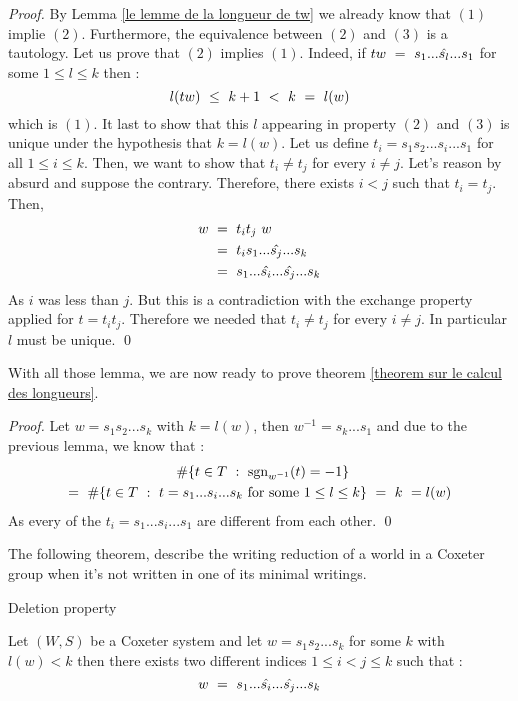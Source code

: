 \begin{proof}
	By Lemma \ref{le lemme de la longueur de tw} we already know that $(1)$ implie $(2)$. Furthermore, the equivalence between $(2)$ and $(3)$ is a tautology. Let us prove that $(2)$ implies $(1)$. Indeed, if $tw\text{ }=\text{ } s_1...\hat{s_l}...s_1$ for some $1\leq l\leq k$ then :
	\begin{equation}
	l(tw)\text{ } \leq \text{ } k+1\text{ } <\text{ } k \text{ }=\text{ } l(w)
	\end{equation} 
	which is $(1)$. It last to show that this $l$ appearing in property $(2)$ and $(3)$ is unique under the hypothesis that $k=l(w)$. Let us define $t_i=s_1s_2...s_i...s_1$ for all $1\leq i\leq k$. Then, we want to show that  $t_i\not=t_j$ for every $i\not=j$. Let's reason by absurd and suppose the contrary. Therefore, there exists $i<j$ such that $t_i=t_j$. Then, 
	\begin{equation}
	\begin{split}
	w\text{ }&=\text{ } t_it_j\text{ } w\\
	&=\text{ } t_is_1...\hat{s_j}...s_k\\
	&=\text{ } s_1...\hat{s_i}...\hat{s_j}...s_k
	\end{split}
	\end{equation} 
	As $i$ was less than $j$. But this is a contradiction with the exchange property applied for $t=t_it_j$. Therefore we needed that $t_i\not=t_j$ for every $i\not=j$. In particular $l$ must be unique.
	\qed 
\end{proof}
With all those lemma, we are now ready to prove theorem \ref{theorem sur le calcul des longueurs}. 
\begin{proof}
	Let $w=s_1s_2...s_k$ with $k=l(w)$, then $w^{-1}=s_k...s_1$ and due to the previous lemma, we know that :
	\begin{equation}
	\begin{split}
		\#\{t\in T\text{ } :\text{ } \mbox{sgn}_{w^{-1}}(t)=-1\}\text{ }\quad\quad\quad\quad\quad\quad\quad \\
		=\text{ } \# \{t\in T\text{ }:\text{ } t=s_1...s_i...s_k\text{ } \mbox{for some }1\leq l\leq k\}\text{ }=\text{ } k\text{ } =l(w)
	\end{split}
	\end{equation}
	As every of the $t_i=s_1...s_i...s_1$ are different from each other. \qed
\end{proof}
The following theorem, describe the writing reduction of a world in a Coxeter group when it's not written in one of its minimal writings. 
\begin{theorem}\begin{center}
		Deletion property
	\end{center}
	Let $(W,S)$ be a Coxeter system and let $w=s_1s_2...s_k$ for some $k$ with $l(w)<k$ then there exists two different indices $1\leq i<j\leq k$ such that :
	\begin{equation}
	w\text{ }=\text{ } s_1...\hat{s_i}...\hat{s_j}...s_k
	\end{equation}
\end{theorem}
